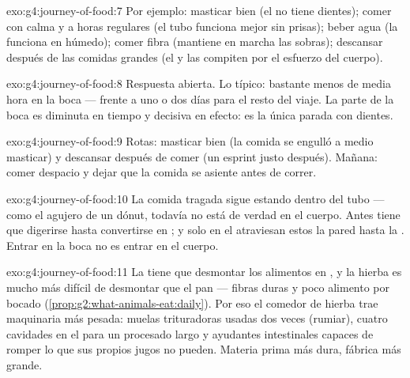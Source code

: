 \begin{solution}{exo:g4:journey-of-food:7}
Por ejemplo: masticar bien (el  no tiene dientes); comer con
calma y a horas regulares (el tubo funciona mejor sin prisas); beber
agua (la  funciona en húmedo); comer fibra (mantiene en
marcha las sobras); descansar después de las comidas grandes (el
 y las  compiten por el esfuerzo del cuerpo).
\end{solution}

\begin{solution}{exo:g4:journey-of-food:8}
Respuesta abierta. Lo típico: bastante menos de media hora en la boca
--- frente a uno o dos días para el resto del viaje. La parte de la
boca es diminuta en tiempo y decisiva en efecto: es la única parada
con dientes.
\end{solution}

\begin{solution}{exo:g4:journey-of-food:9}
Rotas: masticar bien (la comida se engulló a medio masticar) y
descansar después de comer (un esprint justo después). Mañana: comer
despacio y dejar que la comida se asiente antes de correr.
\end{solution}

\begin{solution}{exo:g4:journey-of-food:10}
La comida tragada sigue estando dentro del tubo --- como el agujero de
un dónut, todavía no está de verdad en el cuerpo. Antes tiene que
digerirse hasta convertirse en ; y solo en el  atraviesan estos la pared hasta la . Entrar en la boca
no es entrar en el cuerpo.
\end{solution}

\begin{solution}{exo:g4:journey-of-food:11}
La  tiene que desmontar los alimentos en , y la
hierba es mucho más difícil de desmontar que el pan --- fibras duras y
poco alimento por bocado
(\cref{prop:g2:what-animals-eat:daily}). Por eso el comedor de hierba
trae maquinaria más pesada: muelas trituradoras usadas dos veces
(rumiar), cuatro cavidades en el  para un procesado largo y
ayudantes intestinales capaces de romper lo que sus propios jugos no
pueden. Materia prima más dura, fábrica más grande.
\end{solution}
